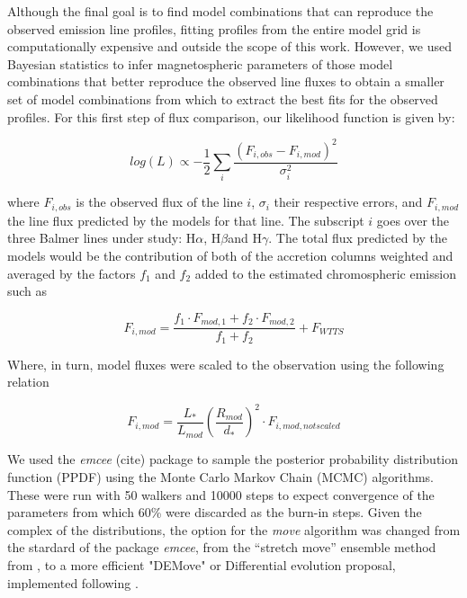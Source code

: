 \documentclass[twocolumn,linenumbers]{aastex631}
\newcommand{\halpha}{H$\alpha$}
\newcommand{\hbeta}{H$\beta$}
\newcommand{\hgamma}{H$\gamma$}
\begin{document}
Although the final goal is to find model combinations that can reproduce the observed emission line profiles, fitting profiles from the entire model grid is computationally expensive and outside the scope of this work. However, we used Bayesian statistics to infer magnetospheric parameters of those model combinations that better reproduce the observed line fluxes to obtain a smaller set of model combinations from which to extract the best fits for the observed profiles. For this first step of flux comparison, our likelihood function is given by:

\begin{equation}
    log (L) \propto -\frac{1}{2} \sum_i \frac{(F_{i,obs}-F_{i,mod})^2}{\sigma_{i}^2}
\end{equation}

where $F_{i,obs}$ is the observed flux of the line $i$, $\sigma_i$ their respective errors, and $F_{i,mod}$ the line flux predicted by the models for that line. The subscript $i$ goes over the three Balmer lines under study: \halpha, \hbeta and \hgamma. The total flux predicted by the models would be the contribution of both of the accretion columns weighted and averaged by the factors $f_1$ and $f_2$ added to the estimated chromospheric emission such as

\begin{equation}
    F_{i,mod} = \frac{f_1 \cdot F_{mod,1} + f_2 \cdot F_{mod,2}}{f_1 + f_2} + F_{WTTS}
\end{equation}

Where, in turn, model fluxes were scaled to the observation using the following relation

\begin{equation}
    F_{i,mod} = \frac{L_*}{L_{mod}}\left(\frac{R_{mod}}{d_*}\right)^2 \cdot F_{i,mod,not scaled}
\end{equation}

We used the \textit{emcee} (cite) package to sample the posterior probability distribution function (PPDF) using the Monte Carlo Markov Chain (MCMC) algorithms. These were run with 50 walkers and 10000 steps to expect convergence of the parameters from which 60\% were discarded as the burn-in steps. Given the complex of the distributions, the option for the \textit{move} algorithm was changed from the stardard of the package \textit{emcee}, from the “stretch move” ensemble method from \citet{goodman-weare2010}, to a more efficient  "DEMove" or Differential evolution proposal, implemented following \citet{Nelson_2014}. 
\end{document}
